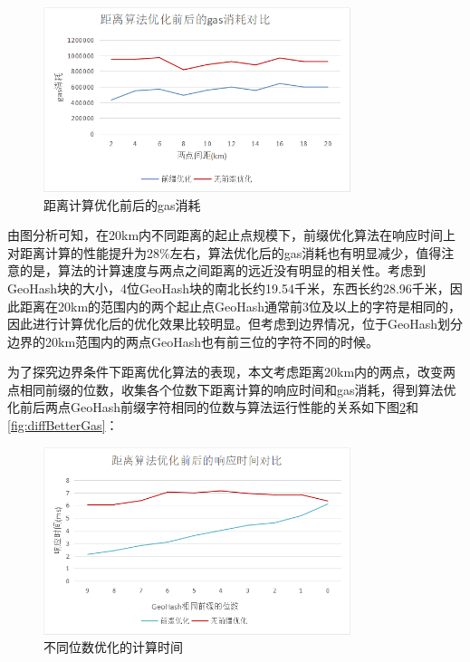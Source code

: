\begin{figure}[h]
  \centering
  \includegraphics[height=0.3\textheight,width=0.8\textwidth]{figures/距离计算优化gas}
  \caption{距离计算优化前后的gas消耗}\label{fig:betterGas}
\end{figure}

由图分析可知，在20km内不同距离的起止点规模下，前缀优化算法在响应时间上对距离计算的性能提升为28$\%$左右，算法优化后的gas消耗也有明显减少，值得注意的是，算法的计算速度与两点之间距离的远近没有明显的相关性。考虑到GeoHash块的大小，4位GeoHash块的南北长约19.54千米，东西长约28.96千米，因此距离在20km的范围内的两个起止点GeoHash通常前3位及以上的字符是相同的，因此进行计算优化后的优化效果比较明显。但考虑到边界情况，位于GeoHash划分边界的20km范围内的两点GeoHash也有前三位的字符不同的时候。

为了探究边界条件下距离优化算法的表现，本文考虑距离20km内的两点，改变两点相同前缀的位数，收集各个位数下距离计算的响应时间和gas消耗，得到算法优化前后两点GeoHash前缀字符相同的位数与算法运行性能的关系如下图\ref{fig:diffBetterTime}和\ref{fig:diffBetterGas}：

\begin{figure}[h]
  \centering
  \includegraphics[height=0.3\textheight,width=0.8\textwidth]{figures/不同位数优化时间}
  \caption{不同位数优化的计算时间}\label{fig:diffBetterTime}
\end{figure}

